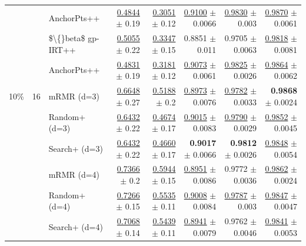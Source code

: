 \begin{longtable}{llp{}rrrrr}
 &  & AnchorPts++ & \underline{0.4844} {\scriptsize $\pm$ 0.19} & \underline{0.3051} {\scriptsize $\pm$ 0.12} & \underline{0.9100} {\scriptsize $\pm$ 0.0066} & \underline{0.9830} {\scriptsize $\pm$ 0.003} & \underline{0.9870} {\scriptsize $\pm$ 0.0061} \\
 &  & \$\textbackslash\{\}beta\$ gp-IRT++ & \underline{0.5055} {\scriptsize $\pm$ 0.22} & \underline{0.3347} {\scriptsize $\pm$ 0.15} & 0.8851 {\scriptsize $\pm$ 0.011} & 0.9705 {\scriptsize $\pm$ 0.0063} & \underline{0.9818} {\scriptsize $\pm$ 0.0081} \\
 &  & AnchorPts++ & \underline{0.4831} {\scriptsize $\pm$ 0.19} & \underline{0.3181} {\scriptsize $\pm$ 0.12} & \underline{0.9073} {\scriptsize $\pm$ 0.0061} & \underline{0.9825} {\scriptsize $\pm$ 0.0026} & \underline{0.9864} {\scriptsize $\pm$ 0.0062} \\
\midrule
10\% & 16 & mRMR (d=3) & \underline{0.6648} {\scriptsize $\pm$ 0.27} & \underline{0.5188} {\scriptsize $\pm$ 0.2} & \underline{0.8973} {\scriptsize $\pm$ 0.0076} & \underline{0.9782} {\scriptsize $\pm$ 0.0033} & \textbf{0.9868} {\scriptsize $\pm$ 0.0024} \\
 &  & Random+ (d=3) & \underline{0.6432} {\scriptsize $\pm$ 0.22} & \underline{0.4674} {\scriptsize $\pm$ 0.17} & \underline{0.9015} {\scriptsize $\pm$ 0.0083} & \underline{0.9790} {\scriptsize $\pm$ 0.0029} & \underline{0.9852} {\scriptsize $\pm$ 0.0045} \\
 &  & Search+ (d=3) & \underline{0.6432} {\scriptsize $\pm$ 0.22} & \underline{0.4660} {\scriptsize $\pm$ 0.17} & \textbf{0.9017} {\scriptsize $\pm$ 0.0066} & \textbf{0.9812} {\scriptsize $\pm$ 0.0026} & \underline{0.9848} {\scriptsize $\pm$ 0.0054} \\
 &  & mRMR (d=4) & \underline{0.7366} {\scriptsize $\pm$ 0.2} & \underline{0.5944} {\scriptsize $\pm$ 0.15} & \underline{0.8951} {\scriptsize $\pm$ 0.0086} & 0.9772 {\scriptsize $\pm$ 0.0036} & \underline{0.9862} {\scriptsize $\pm$ 0.0024} \\
 &  & Random+ (d=4) & \underline{0.7266} {\scriptsize $\pm$ 0.15} & \underline{0.5535} {\scriptsize $\pm$ 0.11} & \underline{0.9008} {\scriptsize $\pm$ 0.0084} & \underline{0.9787} {\scriptsize $\pm$ 0.003} & \underline{0.9847} {\scriptsize $\pm$ 0.0047} \\
 &  & Search+ (d=4) & \underline{0.7068} {\scriptsize $\pm$ 0.14} & \underline{0.5439} {\scriptsize $\pm$ 0.11} & \underline{0.8941} {\scriptsize $\pm$ 0.0079} & 0.9762 {\scriptsize $\pm$ 0.0046} & \underline{0.9841} {\scriptsize $\pm$ 0.0053} \\

\end{longtable}
